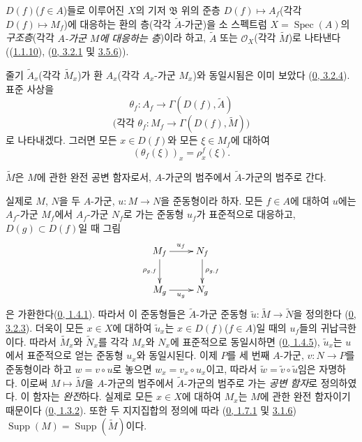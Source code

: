 \begin{definition}[1.3.4]
\label{I.1.3.4-ko}
$D(f)$($f\in A$)들로 이루어진 $X$의 기저 $\mathfrak{B}$ 위의
준층 $D(f)\mapsto A_f$(각각 $D(f)\mapsto M_f$)에 대응하는 환의
층(각각 $\widetilde{A}$-가군)을 소 스펙트럼
$X=\operatorname{Spec}(A)$의 \emph{구조층}(각각 \emph{$A$-가군
$M$에 대응하는 층})이라 하고, $\widetilde{A}$ 또는
$\mathscr{O}_X$(각각 $\widetilde{M}$)로 나타낸다
((\hyperref[I.1.1.10-ko]{1.1.10}),
(\hyperref[0.3.2.1-ko]{0, 3.2.1} 및
\hyperref[0.3.5.6-ko]{3.5.6})).
\end{definition}

줄기 $\widetilde{A}_x$(각각 $\widetilde{M}_x$)가 환 $A_x$(각각
$A_x$-가군 $M_x$)와 동일시됨은 이미 보았다
(\hyperref[0.3.2.4-ko]{0, 3.2.4}). 표준 사상을
\[
  \theta_f:A_f\longrightarrow\Gamma(D(f),\widetilde{A})
\]
\[
  \text{(각각 }\theta_f:M_f\longrightarrow
  \Gamma(D(f),\widetilde{M})\text{)}
\]
로 나타내겠다. 그러면 모든 $x\in D(f)$와 모든 $\xi\in M_f$에
대하여
\begin{equation}
  (\theta_f(\xi))_x=\rho_x^f(\xi).
  \tag{1.3.4.1}\label{I.1.3.4.1-ko}
\end{equation}

\begin{proposition}[1.3.5]
\label{I.1.3.5-ko}
$\widetilde{M}$은 $M$에 관한 완전 공변 함자로서, $A$-가군의
범주에서 $\widetilde{A}$-가군의 범주로 간다.
\end{proposition}

실제로 $M$, $N$을 두 $A$-가군, $u:M\to N$을 준동형이라 하자.
모든 $f\in A$에 대하여 $u$에는 $A_f$-가군 $M_f$에서
$A_f$-가군 $N_f$로 가는 준동형 $u_f$가 표준적으로 대응하고,
$D(g)\subset D(f)$일 때 그림
\[
  \xymatrix{
    M_f\ar[r]^{u_f}\ar[d]_{\rho_{g,f}} & N_f\ar[d]^{\rho_{g,f}}\\
    M_g\ar[r]_{u_g} & N_g
  }
\]
은 가환한다(\hyperref[0.1.4.1-ko]{0, 1.4.1}). 따라서 이 준동형들은
$\widetilde{A}$-가군 준동형
$\widetilde{u}:\widetilde{M}\to\widetilde{N}$을 정의한다
(\hyperref[0.3.2.3-ko]{0, 3.2.3}). 더욱이 모든 $x\in X$에 대하여
$\widetilde{u}_x$는 $x\in D(f)$($f\in A$)일 때의 $u_f$들의
귀납극한이다. 따라서 $\widetilde{M}_x$와 $\widetilde{N}_x$를 각각
$M_x$와 $N_x$에 표준적으로 동일시하면
(\hyperref[0.1.4.5-ko]{0, 1.4.5}), $\widetilde{u}_x$는 $u$에서
표준적으로 얻는 준동형 $u_x$와 동일시된다. 이제 $P$를 세 번째
$A$-가군, $v:N\to P$를 준동형이라 하고 $w=v\circ u$로 놓으면
$w_x=v_x\circ u_x$이고, 따라서
$\widetilde{w}=\widetilde{v}\circ\widetilde{u}$임은 자명하다. 이로써
$M\mapsto\widetilde{M}$을 $A$-가군의 범주에서
$\widetilde{A}$-가군의 범주로 가는 \emph{공변 함자}로 정의하였다.
이 함자는 \emph{완전}하다. 실제로 모든 $x\in X$에 대하여 $M_x$는
$M$에 관한 완전 함자이기 때문이다
(\hyperref[0.1.3.2-ko]{0, 1.3.2}). 또한 두 지지집합의 정의에 따라
(\hyperref[0.1.7.1-ko]{0, 1.7.1} 및
\hyperref[0.3.1.6-ko]{3.1.6})
$\operatorname{Supp}(M)=\operatorname{Supp}(\widetilde{M})$이다.

